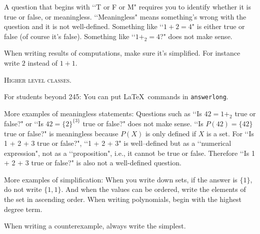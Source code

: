 A question that begins with \lq\lq T or F or M"
requires you to identify whether it is true or
false, or meaningless.
\lq\lq Meaningless" means something's wrong with the question and
it is not well-defined.
Something like
\lq\lq $1 + 2 = 4$" is either true or false (of course it's false).
Something like
\lq\lq $1 +_2 = 4$?" does not make sense.

When writing results of computations, make sure it's simplified.
For instance write $2$ instead of $1 + 1$.

\textsc{Higher level classes.}

For students beyond 245: You can put \LaTeX\ commands in
\verb!answerlong!.

More examples of meaningless statements:
Questions such as
\lq\lq Is $42 = 1 +_2$ true or false?" or
\lq\lq Is $42 = \{2\}^{\{3\}}$ true or false?"
does not make sense.
\lq\lq Is $P(42) = \{42\}$ true or false?" is meaningless because $P(X)$
is only defined if $X$ is a set.
For \lq\lq Is 1 + 2 + 3 true or false?", \lq\lq 1 + 2 + 3" is well--defined but
as a
\lq\lq numerical expression", not as a \lq\lq proposition", i.e.,
it cannot be true or false.
Therefore \lq\lq Is 1 + 2 + 3 true or false?" is also not a well-defined
question.

More examples of simplification: 
When you write down sets,
if the answer is $\{1\}$, do not write $\{1, 1\}$.
And when the values can be ordered, write the elements of the set in 
ascending order.
When writing polynomials, begin with the highest degree term.

When writing a counterexample, always write the simplest.
